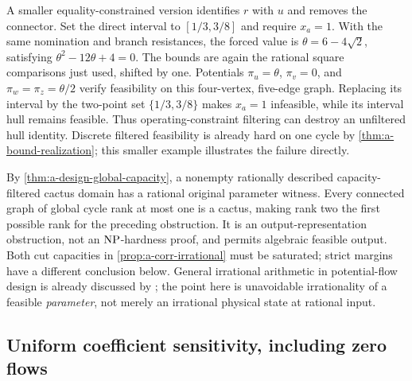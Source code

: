 A smaller equality-constrained version identifies $r$ with $u$ and
removes the connector. Set the direct interval to $[1/3,3/8]$ and require
$x_a=1$. With the same nomination and branch resistances, the forced
value is $\theta=6-4\sqrt2$, satisfying $\theta^2-12\theta+4=0$.
The bounds are again the rational square comparisons just used, shifted
by one. Potentials $\pi_u=\theta$, $\pi_v=0$, and
$\pi_w=\pi_z=\theta/2$ verify feasibility on this four-vertex, five-edge
graph. Replacing its interval by the two-point set $\{1/3,3/8\}$ makes
$x_a=1$ infeasible, while its interval hull remains feasible. Thus
operating-constraint filtering can destroy an unfiltered hull identity.
Discrete filtered feasibility is already hard on one cycle by
\cref{thm:a-bound-realization}; this smaller example illustrates the
failure directly.

By \cref{thm:a-design-global-capacity}, a nonempty rationally described
capacity-filtered cactus domain has a rational original parameter
witness. Every connected graph of global cycle rank at most one is a
cactus, making rank two the first possible rank for the preceding
obstruction. It is an output-representation obstruction, not an
$\mathrm{NP}$-hardness proof, and permits algebraic feasible output. Both cut
capacities in \cref{prop:a-corr-irrational} must be saturated; strict
margins have a different conclusion below. General irrational
arithmetic in potential-flow design is already discussed by
\citet[Remark 8]{klimm2026-approximating-the-network-design-problem}; the
point here is unavoidable irrationality of a feasible \emph{parameter},
not merely an irrational physical state at rational input.

\subsection{Uniform coefficient sensitivity, including zero flows}

